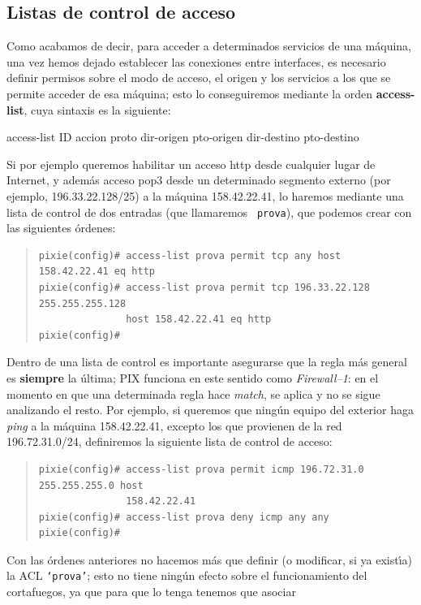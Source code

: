 \subsection{Listas de control de acceso}
Como acabamos de decir, para acceder a determinados servicios de una m\'aquina,
una vez hemos dejado establecer las conexiones entre interfaces, es necesario
definir permisos sobre el modo de acceso, el origen y los servicios a los que 
se permite acceder de esa m\'aquina; esto lo conseguiremos mediante la orden
{\bf access-list}, cuya sintaxis es la siguiente:
\begin{center}
access-list ID accion proto dir-origen pto-origen dir-destino pto-destino
\end{center}
Si por ejemplo queremos habilitar un acceso {\sc http} desde cualquier lugar de 
Internet, y adem\'as acceso {\sc pop3} desde un determinado segmento externo
(por ejemplo, 196.33.22.128/25) a la m\'aquina 158.42.22.41, lo 
haremos mediante una lista de control de dos entradas (que llamaremos {\tt 
prova}), que podemos crear con las siguientes \'ordenes:
\begin{quote}
\begin{verbatim}
pixie(config)# access-list prova permit tcp any host 158.42.22.41 eq http
pixie(config)# access-list prova permit tcp 196.33.22.128 255.255.255.128 
               host 158.42.22.41 eq http
pixie(config)# 
\end{verbatim}
\end{quote}
Dentro de una lista de control es importante asegurarse que la regla m\'as
general es {\bf siempre} la \'ultima; PIX funciona en este sentido como {\it
Firewall--1}: en el momento en que una determinada regla hace {\it match}, se
aplica y no se sigue analizando el resto. Por ejemplo, si queremos que 
ning\'un equipo del exterior haga {\it ping} a la m\'aquina 158.42.22.41, 
excepto los que provienen de la red 196.72.31.0/24, definiremos la siguiente
lista de control de acceso:
\begin{quote}
\begin{verbatim}
pixie(config)# access-list prova permit icmp 196.72.31.0 255.255.255.0 host 
               158.42.22.41
pixie(config)# access-list prova deny icmp any any
pixie(config)# 
\end{verbatim}
\end{quote}
Con las \'ordenes anteriores no hacemos m\'as que definir (o modificar, si ya
exist\'{\i}a) la ACL {\tt `prova'}; esto no tiene ning\'un efecto sobre el 
funcionamiento del cortafuegos, ya que para que lo tenga tenemos que asociar 
